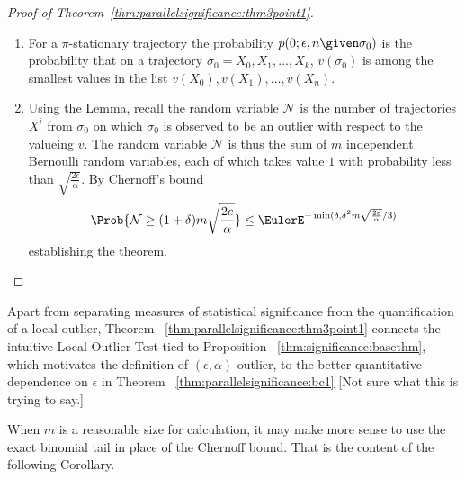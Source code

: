 \documentclass[12pt]{article}
\begin{document}
\begin{proof}[Proof of Theorem~\ref{thm:parallelsignificance:thm3point1}]
    \begin{enumerate}
        \item
            For a \( \pi \)-stationary trajectory the
            probability \( p(0; \epsilon, n \given \sigma_0) \) is the
            probability that on a trajectory \( \sigma_0 = X_0, X_1,
            \dots, X_k \), \( v(\sigma_0) \) is among the smallest
            values in the list \( v(X_0), v(X_1), \dots, v(X_n) \).
        \item
            Using the Lemma, recall the random variable \(
            \mathcal{N} \) is the number of trajectories \( X^i \) from \(
            \sigma_0 \) on which \( \sigma_0 \) is observed to be an
            outlier with respect to the valueing \( v \).  The random
            variable \( \mathcal{N} \) is thus the sum of \( m \)
            independent Bernoulli random variables, each of which takes
            value \( 1 \) with probability less than \( \sqrt{\frac{2
            \epsilon}{\alpha}} \).  By Chernoff's bound
            \[
                \Prob{\mathcal{N} \ge (1 + \delta) m \sqrt{\frac{2e}{\alpha}}
                } \le \EulerE^{ -\min (\delta, \delta^2 m \sqrt{\frac{2e}
                {\alpha}}/3)}
            \] establishing the theorem.
    \end{enumerate}
\end{proof}

  \begin{remark}
    Apart from separating measures of statistical significance from the
    quantification of a local outlier, Theorem~%
    \ref{thm:parallelsignificance:thm3point1} connects the intuitive Local
    Outlier Test tied to Proposition~%
    \ref{thm:significance:basethm}, which motivates the definition of \(
    (\epsilon, \alpha) \)-outlier, to the better quantitative dependence
    on \( \epsilon \) in Theorem~%
    \ref{thm:parallelsignificance:bc1} [Not sure what this is trying to say.]
\end{remark}

\begin{remark}
    When \( m \) is a reasonable size for calculation, it may make more
    sense to use the exact binomial tail in place of the Chernoff bound.
    That is the content of the following Corollary.
\end{remark}
\end{document}

